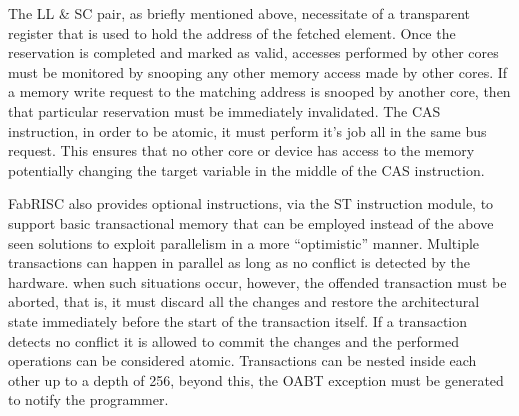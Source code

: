         The LL \& SC pair, as briefly mentioned above, necessitate of a transparent register that is used to hold the address of the fetched element. Once the reservation is completed and marked as valid, accesses performed by other cores must be monitored by snooping any other memory access made by other cores. If a memory write request to the matching address is snooped by another core, then that particular reservation must be immediately invalidated. The CAS instruction, in order to be atomic, it must perform it's job all in the same bus request. This ensures that no other core or device has access to the memory potentially changing the target variable in the middle of the CAS instruction.

        \vspace{10pt}

        FabRISC also provides optional instructions, via the ST instruction module, to support basic transactional memory that can be employed instead of the above seen solutions to exploit parallelism in a more ``optimistic'' manner. Multiple transactions can happen in parallel as long as no conflict is detected by the hardware. when such situations occur, however, the offended transaction must be aborted, that is, it must discard all the changes and restore the architectural state immediately before the start of the transaction itself. If a transaction detects no conflict it is allowed to commit the changes and the performed operations can be considered atomic. Transactions can be nested inside each other up to a depth of 256, beyond this, the OABT exception must be generated to notify the programmer.

